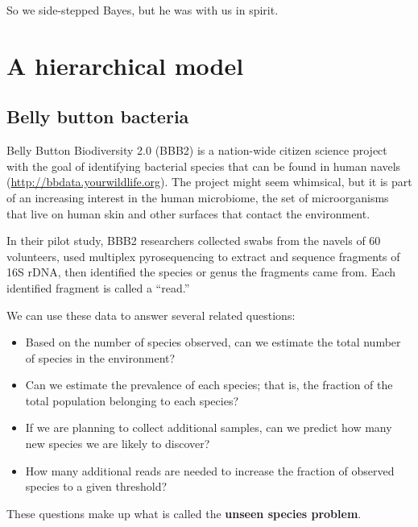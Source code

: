 \documentclass[12pt]{book}
\begin{document}
So we side-stepped Bayes, but he was with us in spirit.


\chapter{A hierarchical model}
\label{species}

\section{Belly button bacteria}

Belly Button Biodiversity 2.0 (BBB2) is a nation-wide citizen
science project with the goal of identifying bacterial species that
can be found in human navels (\url{http://bbdata.yourwildlife.org}).
The project might seem whimsical, but it is part of an increasing
interest in the human microbiome, the set of microorganisms that live
on human skin and other surfaces that contact the environment.

In their pilot study, BBB2 researchers collected swabs from the navels
of 60 volunteers, used multiplex pyrosequencing to extract and sequence
fragments of 16S rDNA, then identified the species or genus the
fragments came from.  Each identified fragment is called a ``read.''

We can use these data to answer several related questions:

\begin{itemize}

\item Based on the number of species observed, can we estimate
  the total number of species in the environment?

\item Can we estimate the prevalence of each species; that is, the
  fraction of the total population belonging to each species?

\item If we are planning to collect additional samples, can we predict
  how many new species we are likely to discover?

\item How many additional reads are needed to increase the
  fraction of observed species to a given threshold?

\end{itemize}

These questions make up what is called the {\bf unseen species problem}.
\end{document}

